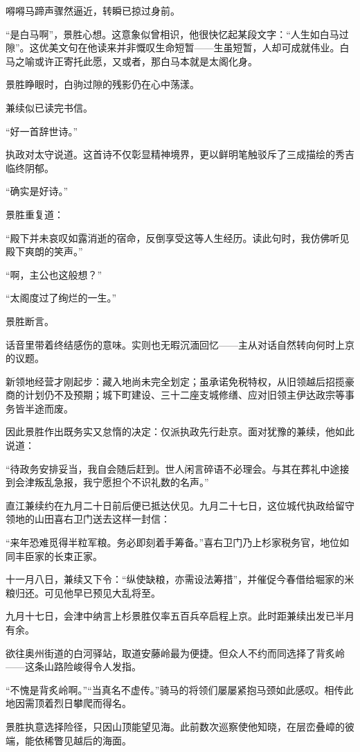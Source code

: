\documentclass[
]{article}
\begin{document}
嘚嘚马蹄声骤然逼近，转瞬已掠过身前。

``是白马啊''，景胜心想。这意象似曾相识，他很快忆起某段文字：``人生如白马过隙''。这优美文句在他读来并非慨叹生命短暂------生虽短暂，人却可成就伟业。白马之喻或许正寄托此愿，又或者，那白马本就是太阁化身。

景胜睁眼时，白驹过隙的残影仍在心中荡漾。

兼续似已读完书信。

``好一首辞世诗。''

执政对太守说道。这首诗不仅彰显精神境界，更以鲜明笔触驳斥了三成描绘的秀吉临终阴郁。

``确实是好诗。''

景胜重复道：

``殿下并未哀叹如露消逝的宿命，反倒享受这等人生经历。读此句时，我仿佛听见殿下爽朗的笑声。''

``啊，主公也这般想？''

``太阁度过了绚烂的一生。''

景胜断言。

话音里带着终结感伤的意味。实则也无暇沉湎回忆------主从对话自然转向何时上京的议题。

新领地经营才刚起步：藏入地尚未完全划定；虽承诺免税特权，从旧领越后招揽豪商的计划仍不及预期；城下町建设、三十二座支城修缮、应对旧领主伊达政宗等事务皆半途而废。

因此景胜作出既务实又怠惰的决定：仅派执政先行赴京。面对犹豫的兼续，他如此说道：

``待政务安排妥当，我自会随后赶到。世人闲言碎语不必理会。与其在葬礼中途接到会津叛乱急报，我宁愿担个不识礼数的名声。''

直江兼续约在九月二十日前后便已抵达伏见。九月二十七日，这位城代执政给留守领地的山田喜右卫门送去这样一封信：

``来年恐难觅得半粒军粮。务必即刻着手筹备。''喜右卫门乃上杉家税务官，地位如同丰臣家的长束正家。

十一月八日，兼续又下令：``纵使缺粮，亦需设法筹措''，并催促今春借给堀家的米粮归还。可见他早已预见大乱将至。

九月十七日，会津中纳言上杉景胜仅率五百兵卒启程上京。此时距兼续出发已半月有余。

欲往奥州街道的白河驿站，取道安藤岭最为便捷。但众人不约而同选择了背炙岭------这条山路险峻得令人发指。

``不愧是背炙岭啊。''``当真名不虚传。''骑马的将领们屡屡紧抱马颈如此感叹。相传此地因需顶着烈日攀爬而得名。

景胜执意选择险径，只因山顶能望见海。此前数次巡察使他知晓，在层峦叠嶂的彼端，能依稀瞥见越后的海面。
\end{document}
